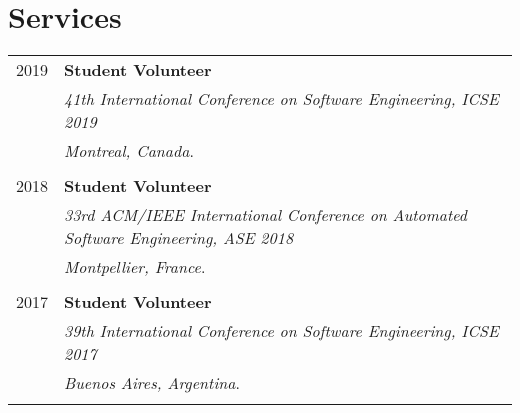 \documentclass[a4paper,10pt]{article} %
\begin{document}
\section{Services}
\begin{longtable}{rl}
\textsc{2019}	& \textbf{Student Volunteer} \\ 
& \textit{41th International Conference on Software Engineering, ICSE 2019} \\ 
& \textit{Montreal, Canada}. \\ & \\

\textsc{2018}	& \textbf{Student Volunteer} \\
& \textit{33rd ACM/IEEE International Conference on Automated Software Engineering, ASE 2018} \\
& \textit{Montpellier, France}. \\ & \\

\textsc{2017}	& \textbf{Student Volunteer} \\ 
& \textit{39th International Conference on Software Engineering, ICSE 2017} \\ 
& \textit{Buenos Aires, Argentina}. \\ & \\
\end{longtable}
\end{document}
